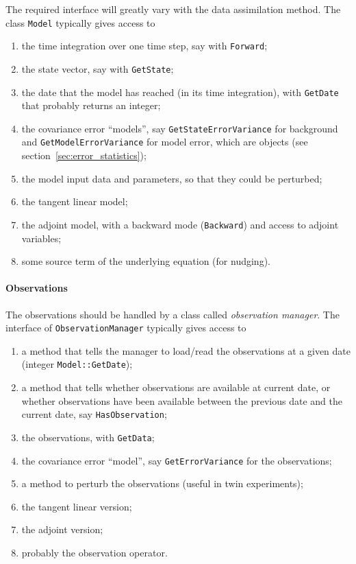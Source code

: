\documentclass{tufte-book}
\newcommand{\code}[1]{\texttt{#1}}
\begin{document}
The required interface will greatly vary with the data assimilation
method. The class \code{Model} typically gives access to
\begin{enumerate}
\item the time integration over one time step, say with \code{Forward};
\item the state vector, say with \code{GetState};
\item the date that the model has reached (in its time integration), with
 \code{GetDate} that probably returns an integer;
\item the covariance error ``models'', say \code{GetStateErrorVariance} for
 background and \code{GetModelErrorVariance} for model error, which are
 objects (see section~\ref{sec:error_statistics});
\item the model input data and parameters, so that they could be perturbed;
\item the tangent linear model;
\item the adjoint model, with a backward mode (\code{Backward}) and access to
 adjoint variables;
\item some source term of the underlying equation (for nudging).
\end{enumerate}

\paragraph{Observations}

The observations should be handled by a class called {\it observation
 manager}. The interface of \code{ObservationManager} typically gives access to
\begin{enumerate}
\item a method that tells the manager to load/read the observations at a given
 date (integer \code{Model::GetDate});
\item a method that tells whether observations are available at current date,
 or whether observations have been available between the previous date and
 the current date, say \code{HasObservation};
\item the observations, with \code{GetData};
\item the covariance error ``model'', say \code{GetErrorVariance} for the
 observations;
\item a method to perturb the observations (useful in twin experiments);
\item the tangent linear version;
\item the adjoint version;
\item probably the observation operator.
\end{enumerate}
\end{document}
